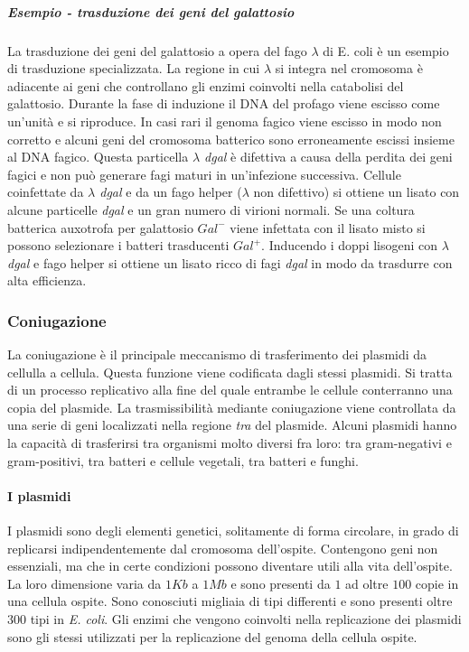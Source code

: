 				\subparagraph{Esempio - trasduzione dei geni del galattosio}
				La trasduzione dei geni del galattosio a opera del fago $\lambda$ di E. coli \`e un esempio di trasduzione specializzata.
				La regione in cui $\lambda$ si integra nel cromosoma \`e adiacente ai geni che controllano gli enzimi coinvolti nella catabolisi del galattosio.
				Durante la fase di induzione il DNA del profago viene escisso come un'unit\`a e si riproduce.
				In casi rari il genoma fagico viene escisso in modo non corretto e alcuni geni del cromosoma batterico sono erroneamente escissi insieme al DNA fagico.
				Questa particella \emph{$\lambda$ dgal} \`e difettiva a causa della perdita dei geni fagici e non pu\`o generare fagi maturi in un'infezione successiva.
				Cellule coinfettate da \emph{$\lambda$ dgal} e da un fago helper ($\lambda$ non difettivo) si ottiene un lisato con alcune particelle \emph{dgal} e un gran numero di virioni normali.
				Se una coltura batterica auxotrofa per galattosio \emph{$Gal^-$} viene infettata con il lisato misto si possono selezionare i batteri trasducenti \emph{$Gal^+$}.
				Inducendo i doppi lisogeni con \emph{$\lambda$ dgal} e fago helper si ottiene un lisato ricco di fagi \emph{dgal} in modo da trasdurre con alta efficienza.

		\subsubsection{Coniugazione}
		La coniugazione è il principale meccanismo di trasferimento dei plasmidi da cellulla a cellula. 
		Questa funzione viene codificata dagli stessi plasmidi. 
		Si tratta di un processo replicativo alla fine del quale entrambe le cellule conterranno una copia del plasmide. 
		La trasmissibilità mediante coniugazione viene controllata da una serie di geni localizzati nella regione \textit{tra} del plasmide. 
		Alcuni plasmidi hanno la capacità di trasferirsi tra organismi molto diversi fra loro: tra gram-negativi e gram-positivi, tra batteri e cellule vegetali, tra batteri e funghi.

			\paragraph{I plasmidi}
			I plasmidi sono degli elementi genetici, solitamente di forma circolare, in grado di replicarsi indipendentemente dal cromosoma dell'ospite.
			Contengono geni non essenziali, ma che in certe condizioni possono diventare utili alla vita dell'ospite. 
			La loro dimensione varia da $1Kb$ a $1 Mb$ e sono presenti da $1$ ad oltre $100$ copie in una cellula ospite. 
			Sono conosciuti migliaia di tipi differenti e sono presenti oltre $300$ tipi in \textit{E. coli}. 
			Gli enzimi che vengono coinvolti nella replicazione dei plasmidi sono gli stessi utilizzati per la replicazione del genoma della cellula ospite.

